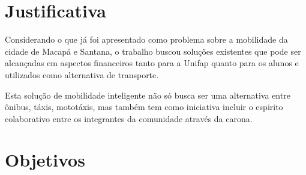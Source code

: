 \section{Justificativa}


Considerando o que já foi apresentado como problema sobre a mobilidade da cidade de Macapá e Santana, o trabalho buscou soluções existentes que pode ser alcançadas em aspectos financeiros tanto para a Unifap quanto para os alunos e utilizados como alternativa de transporte. 

Esta solução de mobilidade inteligente não só busca ser uma alternativa entre ônibus, táxis, mototáxis, mas também tem como iniciativa incluir o espirito colaborativo entre os integrantes da comunidade através da carona.


\begin{comment}
que os problemas de mobilidade existentes
atualmente em Macapá atingem diretamente a comunidade acadêmica da Universidade Federal do Amapá, este trabalho buscará entender o perfil e as principais dificuldades da comunidade acadêmica, e, a partir de um estudo de soluções existentes no contexto de CI para propor uma solução que seja viável e admissível para a comunidade acadêmica da Unifap

%
\end{comment}

\section {Objetivos}

